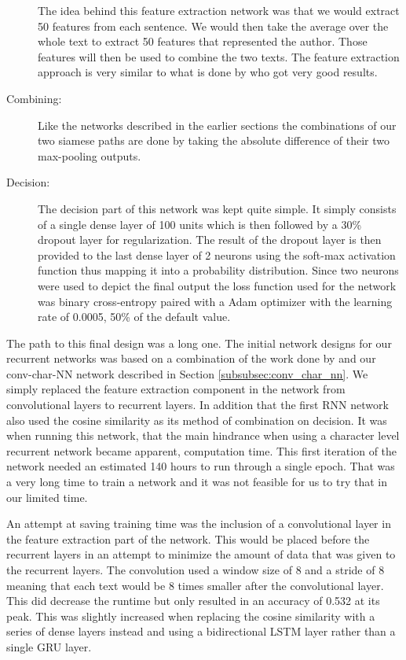\begin{description}
        The idea behind this feature extraction network was that we would
        extract 50 features from each sentence. We would then take the average
        over the whole text to extract 50 features that represented the author.
        Those features will then be used to combine the two texts. The feature
        extraction approach is very similar to what is done by
        \citet{qian:2018} who got very good results.

    \item[Combining:]

        Like the networks described in the earlier sections the combinations
        of our two siamese paths are done by taking the absolute difference
        of their two max-pooling outputs.

    \item[Decision:]

        The decision part of this network was kept quite simple. It simply
        consists of a single dense layer of 100 units which is then followed
        by a 30\% dropout layer for regularization. The result of the dropout
        layer is then provided to the last dense layer of 2 neurons using
        the soft-max activation function thus mapping it into a probability
        distribution. Since two neurons were used to depict the final output
        the loss function used for the network was binary cross-entropy paired
        with a \gls{Adam} optimizer with the learning rate of 0.0005, 50\% of
        the default value.

\end{description}

The path to this final design was a long one. The initial network designs
for our recurrent networks was based on a combination of the work done by
\citet{qian:2018} and our \gls{conv-char-NN} network described in Section
\ref{subsubsec:conv_char_nn}. We simply replaced the feature extraction
component in the network from convolutional layers to recurrent layers. In
addition that the first \gls{RNN} network also used the cosine similarity as its
method of combination on decision. It was when running this network, that the
main hindrance when using a character level recurrent network became apparent,
computation time. This first iteration of the network needed an estimated 140
hours to run through a single epoch. That was a very long time to train a
network and it was not feasible for us to try that in our limited time.

An attempt at saving training time was the inclusion of a convolutional layer
in the feature extraction part of the network. This would be placed before the
recurrent layers in an attempt to minimize the amount of data that was given to
the recurrent layers. The convolution used a window size of 8 and a stride of 8
meaning that each text would be 8 times smaller after the convolutional layer.
This did decrease the runtime but only resulted in an accuracy of 0.532 at its
peak. This was slightly increased when replacing the cosine similarity with a
series of dense layers instead and using a bidirectional \gls{LSTM} layer rather
than a single \gls{GRU} layer.

